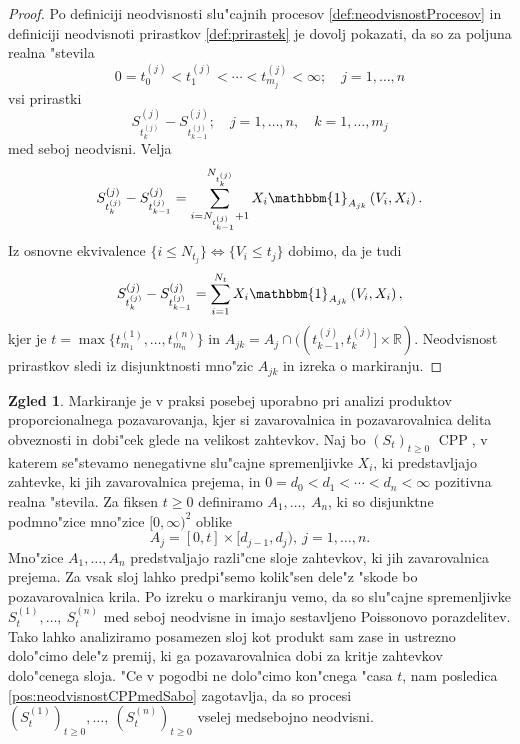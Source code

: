 \documentclass[12pt, a4paper, reqno]{amsart}
\theoremstyle{definition}
\newtheorem{zgled}[definicija]{Zgled}
\theoremstyle{plain}
\newcommand{\R}{\mathbb{R}}
\newcommand{\1}{\mathds{1}}
\DeclareMathOperator{\CPP}{CPP}
\newcommand*{\refPriloga}[1]{%
  \begingroup
    \hypersetup{
      linkcolor=red,
      linkbordercolor=red,
    }%
    \ref{#1}%
  \endgroup
}
\begin{document}
        \begin{proof}
            Po definiciji neodvisnosti slu"cajnih procesov \refPriloga{def:neodvisnostProcesov} in definiciji neodvisnoti 
            prirastkov \refPriloga{def:prirastek} je dovolj pokazati, da so za poljuna realna "stevila
            $$
                0 = t_0^{(j)} < t_1^{(j)} < \cdots < t_{m_j}^{(j)} < \infty; \quad j = 1, \dots, n
            $$
            vsi prirastki 
            $$
                S^{(j)}_{t_k^{(j)}} - S^{(j)}_{t_{k-1}^{(j)}}; \quad j = 1, \dots, n, \quad k = 1, \dots, m_j
            $$
            med seboj neodvisni. Velja 
            $$
                S^{(j)}_{t_k^{(j)}} - S^{(j)}_{t_{k-1}^{(j)}} = \sum_{i = N_{t_{k-1}^{(j)}}+1}^{N_{t_k^{(j)}}}X_i\mathbbm{1}_{A_{jk}}\left(V_i, X_i\right).
            $$
            Iz osnovne ekvivalence $\{i\leq N_{t_j}\} \iff \{V_i \leq t_j\}$ dobimo, da je tudi 
            $$
                S^{(j)}_{t_k^{(j)}} - S^{(j)}_{t_{k-1}^{(j)}} = \sum_{i = 1}^{N_t} X_i\mathbbm{1}_{A_{jk}}\left(V_i, X_i\right),
            $$
            kjer je $t = \max\{t_{m_1}^{(1)}, \dots, t_{m_n}^{(n)}\}$ in $A_{jk} = A_j \cap ((t_{k-1}^{(j)}, t_k^{(j)}]\times \R)$.
            Neodvisnost prirastkov sledi iz disjunktnosti mno"zic $A_{jk}$ in izreka o markiranju.
        \end{proof}
    
        \begin{zgled}
            Markiranje je v praksi posebej uporabno pri analizi produktov 
            proporcionalnega pozavarovanja, kjer si zavarovalnica in  
            pozavarovalnica delita obveznosti in dobi"cek glede na velikost zahtevkov. Naj bo $(S_t)_{t\geq0}$ $\CPP$,  
            v katerem se"stevamo nenegativne slu"cajne spremenljivke $X_i$, ki predstavljajo zahtevke, 
            ki jih zavarovalnica prejema, in $ 0 = d_0 < d_1 < \cdots < d_n < \infty$ pozitivna realna "stevila. 
            Za fiksen $t\geq0$ definiramo 
            $A_1, \dots, \ A_{n }$, ki so disjunktne podmno"zice  mno"zice $[0, \infty)^2$ oblike
            \begin{equation*}
                A_j = [0, t]\times [d_{j-1}, d_j), \ j = 1, \dots, n.
            \end{equation*}
            Mno"zice $A_1, \dots, A_n$ predstvaljajo razli"cne sloje zahtevkov, ki jih zavarovalnica prejema. 
            Za vsak sloj lahko predpi"semo kolik"sen dele"z "skode bo pozavarovalnica krila.
            Po izreku o markiranju vemo, da so slu"cajne spremenljivke $S_t^{(1)}, \dots, \ S_t^{(n)}$ 
            med seboj neodvisne in imajo sestavljeno Poissonovo porazdelitev. Tako lahko analiziramo 
            posamezen sloj kot produkt sam zase in ustrezno dolo"cimo dele"z premij, ki ga pozavarovalnica dobi 
            za kritje zahtevkov dolo"cenega sloja. "Ce v pogodbi ne dolo"cimo kon"cnega "casa $t$,
             nam posledica \ref{pos:neodvisnostCPPmedSabo} zagotavlja, da so procesi 
            $(S_t^{(1)})_{t\geq0}, \dots, \ (S_t^{(n)})_{t\geq0}$ vselej medsebojno neodvisni.
        \end{zgled}
\end{document}
